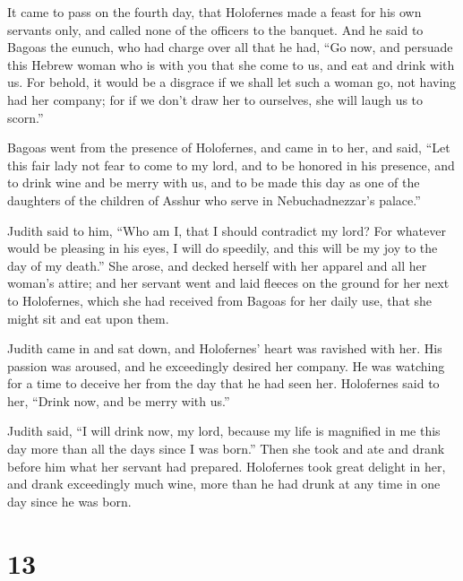  It came to pass on the fourth day, that Holofernes made a
feast for his own servants only, and called none of the officers to the
banquet.  And he said to Bagoas the eunuch, who had charge
over all that he had, ``Go now, and persuade this Hebrew woman who is
with you that she come to us, and eat and drink with us. 
For behold, it would be a disgrace if we shall let such a woman go, not
having had her company; for if we don't draw her to ourselves, she will
laugh us to scorn.''

 Bagoas went from the presence of Holofernes, and came in
to her, and said, ``Let this fair lady not fear to come to my lord, and
to be honored in his presence, and to drink wine and be merry with us,
and to be made this day as one of the daughters of the children of
Asshur who serve in Nebuchadnezzar's palace.''

 Judith said to him, ``Who am I, that I should contradict
my lord? For whatever would be pleasing in his eyes, I will do speedily,
and this will be my joy to the day of my death.''  She
arose, and decked herself with her apparel and all her woman's attire;
and her servant went and laid fleeces on the ground for her next to
Holofernes, which she had received from Bagoas for her daily use, that
she might sit and eat upon them.

 Judith came in and sat down, and Holofernes' heart was
ravished with her. His passion was aroused, and he exceedingly desired
her company. He was watching for a time to deceive her from the day that
he had seen her.  Holofernes said to her, ``Drink now, and
be merry with us.''

 Judith said, ``I will drink now, my lord, because my life
is magnified in me this day more than all the days since I was born.''
 Then she took and ate and drank before him what her
servant had prepared.  Holofernes took great delight in
her, and drank exceedingly much wine, more than he had drunk at any time
in one day since he was born.

\hypertarget{section-12}{%
\section{13}\label{section-12}}

